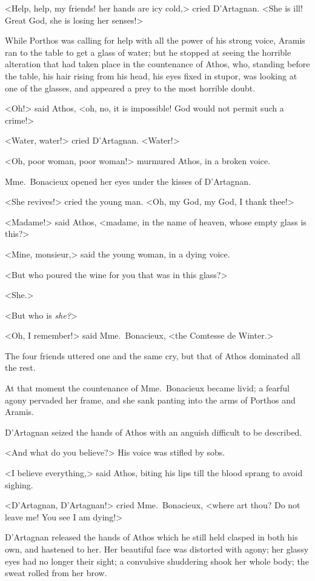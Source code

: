 <Help, help, my friends! her hands are icy cold,> cried D'Artagnan. <She is ill! Great God, she is losing her senses!> 

While Porthos was calling for help with all the power of his strong voice, Aramis ran to the table to get a glass of water; but he stopped at seeing the horrible alteration that had taken place in the countenance of Athos, who, standing before the table, his hair rising from his head, his eyes fixed in stupor, was looking at one of the glasses, and appeared a prey to the most horrible doubt. 

<Oh!> said Athos, <oh, no, it is impossible! God would not permit such a crime!> 

<Water, water!> cried D'Artagnan. <Water!> 

<Oh, poor woman, poor woman!> murmured Athos, in a broken voice. 

Mme.~Bonacieux opened her eyes under the kisses of D'Artagnan. 

<She revives!> cried the young man. <Oh, my God, my God, I thank thee!> 

<Madame!> said Athos, <madame, in the name of heaven, whose empty glass is this?> 

<Mine, monsieur,> said the young woman, in a dying voice. 

<But who poured the wine for you that was in this glass?> 

<She.> 

<But who is \emph{she?}> 

<Oh, I remember!> said Mme.~Bonacieux, <the Comtesse de Winter.> 

The four friends uttered one and the same cry, but that of Athos dominated all the rest. 

At that moment the countenance of Mme.~Bonacieux became livid; a fearful agony pervaded her frame, and she sank panting into the arms of Porthos and Aramis. 

D'Artagnan seized the hands of Athos with an anguish difficult to be described. 

<And what do you believe?> His voice was stifled by sobs. 

<I believe everything,> said Athos, biting his lips till the blood sprang to avoid sighing. 

<D'Artagnan, D'Artagnan!> cried Mme.~Bonacieux, <where art thou? Do not leave me! You see I am dying!> 

D'Artagnan released the hands of Athos which he still held clasped in both his own, and hastened to her. Her beautiful face was distorted with agony; her glassy eyes had no longer their sight; a convulsive shuddering shook her whole body; the sweat rolled from her brow. 

